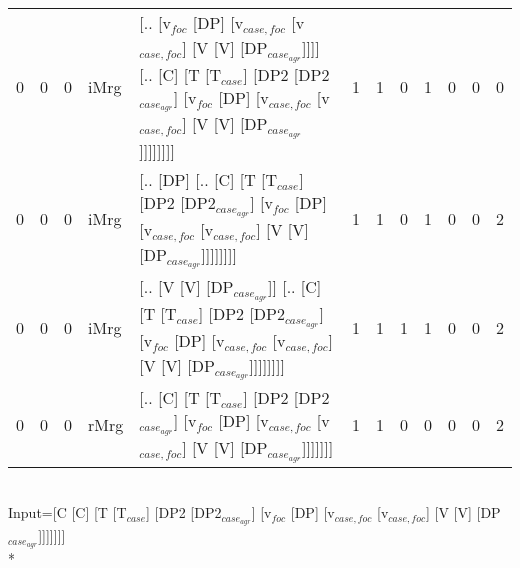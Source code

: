 \begin{tabularx}{\linewidth}{rrrlXrrrrrrr}
   0 &       0 &   0 & iMrg & [.. [v$_{foc}$ [DP] [v$_{case,foc}$ [v$_{case,foc}$] [V [V] [DP$_{case_{agr}}$]]]] [.. [C] [T [T$_{case}$] [DP2 [DP2$_{case_{agr}}$] [v$_{foc}$ [DP] [v$_{case,foc}$ [v$_{case,foc}$] [V [V] [DP$_{case_{agr}}$]]]]]]]]                                   &             1 &             1 &                  0 &            1 &              0 &             0 &          0 \\
   0 &       0 &   0 & iMrg & [.. [DP] [.. [C] [T [T$_{case}$] [DP2 [DP2$_{case_{agr}}$] [v$_{foc}$ [DP] [v$_{case,foc}$ [v$_{case,foc}$] [V [V] [DP$_{case_{agr}}$]]]]]]]]                                                                                           &             1 &             1 &                  0 &            1 &              0 &             0 &          2 \\
   0 &       0 &   0 & iMrg & [.. [V [V] [DP$_{case_{agr}}$]] [.. [C] [T [T$_{case}$] [DP2 [DP2$_{case_{agr}}$] [v$_{foc}$ [DP] [v$_{case,foc}$ [v$_{case,foc}$] [V [V] [DP$_{case_{agr}}$]]]]]]]]                                                                          &             1 &             1 &                  1 &            1 &              0 &             0 &          2 \\
   0 &       0 &   0 & rMrg & [.. [C] [T [T$_{case}$] [DP2 [DP2$_{case_{agr}}$] [v$_{foc}$ [DP] [v$_{case,foc}$ [v$_{case,foc}$] [V [V] [DP$_{case_{agr}}$]]]]]]]                                                                                                     &             1 &             1 &                  0 &            0 &              0 &             0 &          2 \\
\hline
\end{tabularx}\endgroup\\
\begingroup\scriptsize Input=[C [C] [T [T$_{case}$] [DP2 [DP2$_{case_{agr}}$] [v$_{foc}$ [DP] [v$_{case,foc}$ [v$_{case,foc}$] [V [V] [DP$_{case_{agr}}$]]]]]]]\\*
